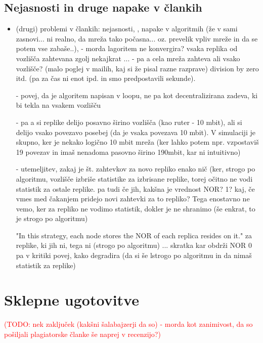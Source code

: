 \documentclass[a4paper, 12pt]{book}
\newcommand{\TODO}[1]{\textcolor{red}{(TODO: #1)}}
\begin{document}
\section{Nejasnosti in druge napake v člankih}

\begin{itemize}

\item (drugi) problemi v člankih: nejasnosti, , napake v algoritmih (že v
sami zasnovi... ni realno, da mreža tako počasna... oz. prevelik vpliv mreže
in da se potem vse zabaše..),
- morda lagoritem ne konvergira? vsaka replika od vozlišča zahtevana zgolj
nekajkrat ...
- pa a cela mreža zahteva ali vsako vozlišče?
(malo poglej v mailih, kaj si že pisal razne razprave)
division by zero itd. (pa za čas ni enot ipd. in smo predpostavili sekunde).

- povej, da je algoritem napisan v loopu, ne pa kot decentralizirana zadeva,
ki bi tekla na vsakem vozlišču

- pa a si replike delijo posavno širino vozlišča (kao ruter - 10 mbit), ali
si delijo vsako povezavo posebej (da je vsaka povezava 10 mbit). V simulaciji
je skupno, ker je nekako logično 10 mbit mreža (ker lahko potem npr.
vzpostaviš 19 povezav in imaš nenadoma pasovno širino 190mbit, kar ni
intuitivno)

- utemeljitev, zakaj je št. zahtevkov za novo repliko enako nič
(ker, strogo po algoritmu, vozlišče izbriše statistike za izbrisane replike,
torej očitno ne vodi statistik za ostale replike.
pa tudi če jih, kakšna je vrednost NOR? 1? kaj, če vmes med čakanjem pridejo
novi zahtevki za to repliko? Tega enostavno ne vemo, ker za repliko
ne vodimo statistik, dokler je ne shranimo (še enkrat, to je strogo po
algoritmu)

"In this strategy, each node stores the NOR of each replica resides
on it."
za replike, ki jih ni, tega ni (strogo po algoritmu) ...
skratka kar obdrži NOR 0 pa v kritiki povej, kako degradira
(da si še lstrogo po algoritmu in da nimaš statistik za replike)

\end{itemize}


\chapter{Sklepne ugotovitve}
\TODO{nek zaključek (kakšni šalabajzerji da so) - morda kot zanimivost, da
so pošiljali plagiatorske članke še naprej v recenzijo?}
\end{document}
